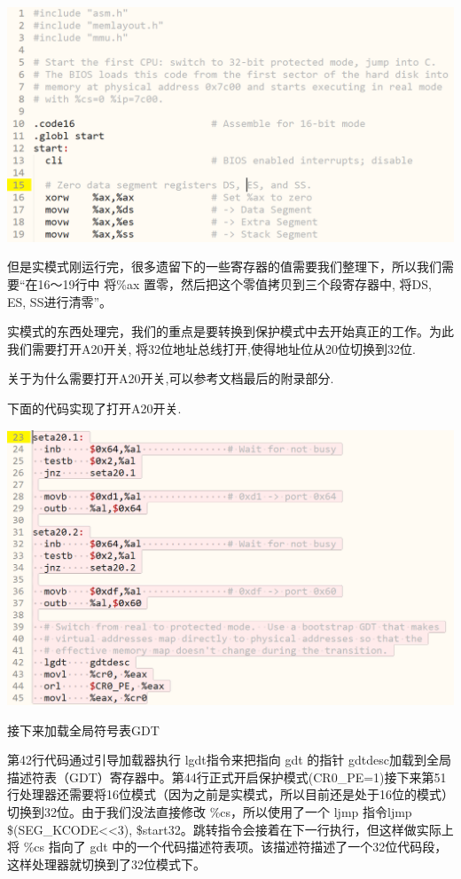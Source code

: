 \includegraphics[width=6in]{figures/boot/fig3.png}


但是实模式刚运行完，很多遗留下的一些寄存器的值需要我们整理下，所以我们需要“在16～19行中 将\%ax 置零，然后把这个零值拷贝到三个段寄存器中, 将DS, ES, SS进行清零”。

实模式的东西处理完，我们的重点是要转换到保护模式中去开始真正的工作。为此我们需要打开A20开关, 将32位地址总线打开,使得地址位从20位切换到32位.

关于为什么需要打开A20开关,可以参考文档最后的附录部分.

下面的代码实现了打开A20开关.

\includegraphics[width=6in]{figures/boot/fig4.png}

接下来加载全局符号表GDT

第42行代码通过引导加载器执行 lgdt指令来把指向 gdt 的指针 gdtdesc加载到全局描述符表（GDT）寄存器中。第44行正式开启保护模式(CR0\_PE=1)接下来第51行处理器还需要将16位模式（因为之前是实模式，所以目前还是处于16位的模式）切换到32位。由于我们没法直接修改 \%cs，所以使用了一个 ljmp 指令ljmp \$(SEG\_KCODE<<3), \$start32。跳转指令会接着在下一行执行，但这样做实际上将 \%cs 指向了 gdt 中的一个代码描述符表项。该描述符描述了一个32位代码段，这样处理器就切换到了32位模式下。

